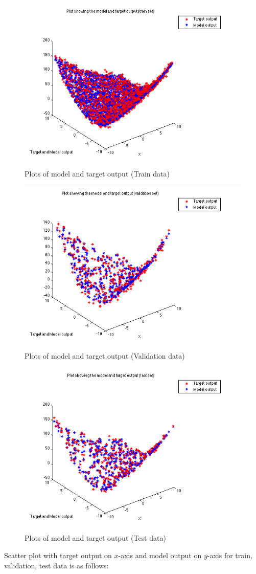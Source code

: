 \documentclass{article}
\begin{document}
\begin{figure}[H]
\centering
\includegraphics[width=0.5\linewidth]{Regression/bivariate/output_1layer_train.png}
\caption{Plots of model and target output (Train data)}
\end{figure}

\begin{figure}[H]
\centering
\includegraphics[width=0.5\linewidth]{Regression/bivariate/output_1layer_val.png}
\caption{Plots of model and target output (Validation data)}
\end{figure}

\begin{figure}[H]
\centering
\includegraphics[width=0.5\linewidth]{Regression/bivariate/output_1layer_test.png}
\caption{Plots of model and target output (Test data)}
\end{figure}

Scatter plot with target output on $x$-axis and model output on $y$-axis for train, validation, test data is as follows:
\end{document}
